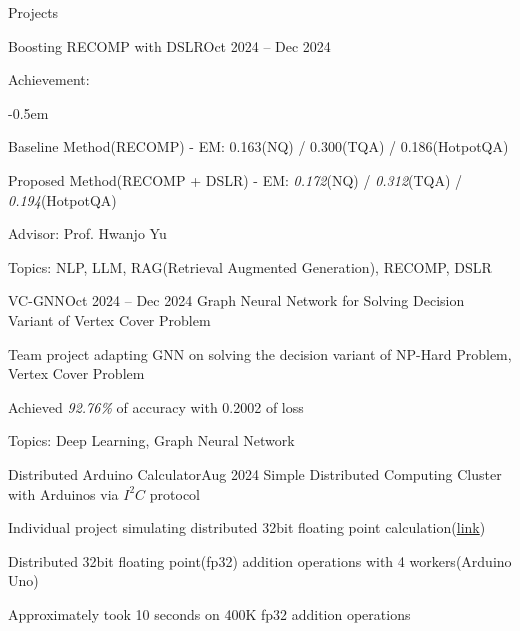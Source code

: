 \documentclass{resume}
\begin{document}
\begin{rSection}{Projects}
\begin{rSubsection}{Boosting RECOMP with DSLR}{Oct 2024 -- Dec 2024}
        \item Achievement:
        \vspace{-0.5em}
        \begin{list}{--}{\setlength{\rightmargin}{1.5em}}
            \itemsep -0.5em

            \item Baseline Method(RECOMP) - EM: 0.163(NQ) / 0.300(TQA) / 0.186(HotpotQA)

            \item Proposed Method(RECOMP + DSLR) - EM: \emph{0.172}(NQ) / \emph{0.312}(TQA) / \emph{0.194}(HotpotQA)
        \end{list}

        \item Advisor: Prof. Hwanjo Yu

        \item Topics: NLP, LLM, RAG(Retrieval Augmented Generation), RECOMP, DSLR
    \end{rSubsection}

    \begin{rSubsection}{VC-GNN}{Oct 2024 -- Dec 2024}
        Graph Neural Network for Solving Decision Variant of Vertex Cover Problem

        \item Team project adapting GNN on solving the decision variant of NP-Hard Problem, Vertex Cover Problem

        \item Achieved \emph{92.76\%} of accuracy with 0.2002 of loss

        \item Topics: Deep Learning, Graph Neural Network
    \end{rSubsection}


    \begin{rSubsection}{Distributed Arduino Calculator}{Aug 2024}
        Simple Distributed Computing Cluster with Arduinos via $I^2C$ protocol

        \item Individual project simulating distributed 32bit floating point calculation(\href{https://github.com/minsusun/kakashi/tree/main/avr/arduino/i2c-distributed-floating-point-calculator}{link})

        \item Distributed 32bit floating point(fp32) addition operations with 4 workers(Arduino Uno)

        \item Approximately took 10 seconds on 400K fp32 addition operations
    \end{rSubsection}


\end{rSection}
\end{document}
